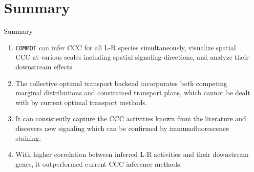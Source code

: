 \documentclass[10pt]{beamer}
\begin{document}

\section{Summary}

\begin{frame}{Summary}
    \begin{enumerate}
        \item \texttt{COMMOT} can infer CCC for all L-R species simultaneously, visualize spatial CCC at various scales including spatial signaling directions, and analyze their downstream effects.
        \item The collective optimal transport backend incorporates both competing marginal distributions 
        and constrained transport plans, which cannot be dealt with by current optimal transport methods.
        \item It can consistently capture the CCC activities known from the literature and 
        discovers new signaling which can be confirmed by immunofluorescence staining.
        \item With higher correlation between inferred L-R activities and their downstream genes, it outperformed current CCC inference methods.
    \end{enumerate}
\end{frame}

\end{document}
